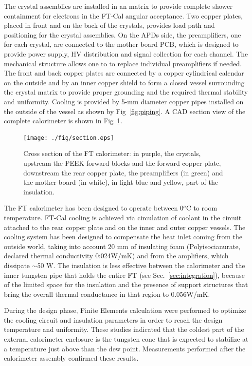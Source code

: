 The crystal assemblies are installed in an
matrix to provide complete shower containment
for electrons in the FT-Cal angular acceptance.
Two copper plates, placed in front and on the back of the crystals, provides load path
and positioning for the crystal assemblies. On
the APDs side, the preamplifiers, one for each crystal, are connected to the mother board PCB, which is designed to provide power supply, HV distribution and signal collection for
each channel. The mechanical structure allows one to 
to replace individual preamplifiers if needed. The front and back copper plates are connected by a copper cylindrical calendar on the outside and by an inner copper shield to form a closed vessel surrounding the crystal matrix to provide proper grounding and the required thermal stability and uniformity. Cooling is provided by 5-mm diameter copper pipes installed on the outside of the vessel as shown by  Fig~\ref{fig:piping}. A CAD section
view of the complete calorimeter is shown in Fig~\ref{fig:calsec}.
\begin{figure}[th!]
\centering 
\texttt{[image: ./fig/section.eps]}
\caption{Cross section of the FT calorimeter: in purple, the crystals, upstream the PEEK forward blocks and the forward copper plate, downstream the rear copper plate, the preamplifiers (in green) and the mother board (in white), in light blue and yellow, part of the insulation.}
\label{fig:calsec} 
\end{figure}


The FT calorimeter has been designed to operate
between 0$^o$C to room temperature. FT-Cal cooling  is achieved via circulation
of coolant in the circuit attached to the rear copper
plate and on the inner and outer copper
vessels. The cooling system has been designed
to compensate the heat inlet coming
from the outside world, taking into account
20 mm of insulating foam (Polyisocianurate,
declared thermal conductivity 0:024W/mK)
and from the amplifiers, which  dissipate $\sim$50 W.
The insulation is less effective between the
calorimeter and the inner tungsten pipe that holds the entire FT (see Sec.~\ref{sec:integration}), because of the limited space for the insulation and the presence of support structures that bring the overall thermal conductance in that region to
0.056W/mK.

During the design phase, Finite Elements calculation 
were performed to optimize the cooling circuit and insulation parameters in order to reach the 
design temperature and
uniformity. These studies indicated that the coldest part of the external calorimeter enclosure is 
the tungsten cone that is expected to stabilize
at a temperature just above than the dew
point. Measurements performed after the calorimeter assembly confirmed these results.


